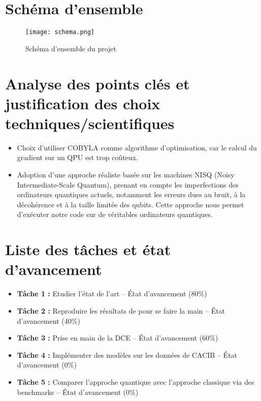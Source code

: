 \documentclass[11pt,a4paper]{article}
\begin{document}
\section{Schéma d'ensemble}
\begin{figure}[h!]
    \centering
    \texttt{[image: schema.png]}
    \caption{Schéma d'ensemble du projet}
    \label{fig:schema}
\end{figure}

\section{Analyse des points clés et justification des choix techniques/scientifiques}

\begin{itemize}
    \item Choix d’utiliser COBYLA comme algorithme d’optimisation, car le calcul du gradient sur un QPU est trop coûteux.
    \item Adoption d'une approche réaliste basée sur les machines NISQ (Noisy Intermediate-Scale Quantum), prenant en compte les imperfections des ordinateurs quantiques actuels, notamment les erreurs dues au bruit, à la décohérence et à la taille limitée des qubits. Cette approche nous permet d'exécuter notre code sur de véritables ordinateurs quantiques.
\end{itemize}

\section{Liste des tâches et état d'avancement}

\begin{itemize}
    \item \textbf{Tâche 1 :} Etudier l'état de l'art -- État d'avancement (80\%)
    \item \textbf{Tâche 2 :} Reproduire les résultats de\cite{lloyd2020quantum} pour se faire la main -- État d'avancement (40\%)
    \item \textbf{Tâche 3 :} Prise en main de la DCE -- État d'avancement (60\%)
    \item \textbf{Tâche 4 :} Implémenter des modèles sur les données de CACIB -- État d'avancement (0\%)
    \item \textbf{Tâche 5 :} Comparer l'approche quantique avec l'approche classique via des benchmarks -- État d'avancement (0\%)
\end{itemize}
\end{document}
